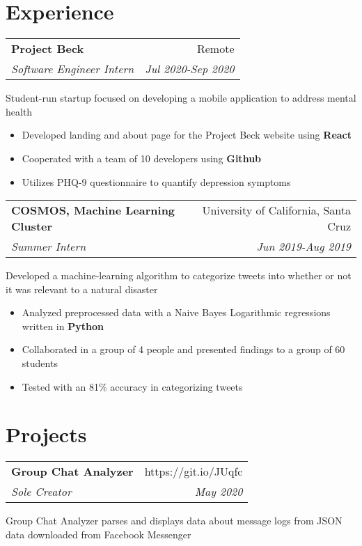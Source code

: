 \documentclass[letterpaper,8pt]{article}
\makeatletter
\newcommand{\resumeSubheading}[4]{
  \vspace{0.25em}
  \begin{tabular*}{1\textwidth}[t]{l@{\extracolsep{\fill}}r}
    \textbf{#1} & #2 \\
    \textit{#3} & \textit{#4} \\
  \end{tabular*}\vspace{-5pt}
}
\makeatother
\begin{document}
\vspace{5pt}
\section{Experience}

\resumeSubheading{Project Beck}{Remote}{Software Engineer Intern}{Jul 2020-Sep 2020}

Student-run startup focused on developing a mobile application to address mental health

\begin{itemize}[label=\raisebox{0.25ex}{\tiny$\bullet$}]
  \item Developed landing and about page for the Project Beck website using \textbf{React}
  \item Cooperated with a team of 10 developers using \textbf{Github}
  \item Utilizes PHQ-9 questionnaire to quantify depression symptoms
\end{itemize}
\vspace{5pt}

\resumeSubheading{COSMOS, Machine Learning Cluster}
{University of California, Santa Cruz}{Summer Intern}{Jun 2019-Aug 2019}

Developed a machine-learning algorithm to categorize tweets into whether or not it was relevant to a natural disaster

\begin{itemize}[label=\raisebox{0.25ex}{\tiny$\bullet$}]
  \item Analyzed preprocessed data with a Naive Bayes Logarithmic regressions written in \textbf{Python}
  \item Collaborated in a group of 4 people and presented findings to a group of 60 students
  \item Tested with an 81\% accuracy in categorizing tweets
\end{itemize}
\vspace{5pt}

\section{Projects}

\resumeSubheading{Group Chat Analyzer}{https://git.io/JUqfc}{Sole Creator}{May 2020}

Group Chat Analyzer parses and displays data about message logs from JSON data downloaded from Facebook Messenger
\end{document}
